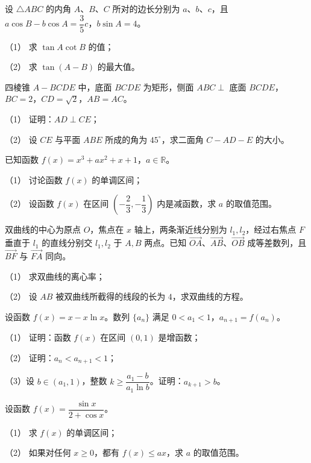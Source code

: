\begin{question}
设 $\triangle ABC$ 的内角 $A\text{、}B\text{、}C$ 所对的边长分别为 $a\text{、}b\text{、}c$，且 $a\cos B-b\cos A=\dfrac35c$，$b\sin A=4$。

（1） 求 $\tan A\cot B$ 的值；

（2） 求 $\tan(A-B)$ 的最大值。

\Needspace{0.4\textheight}
\end{question}
\begin{question}
四棱锥 $A-BCDE$ 中，底面 $BCDE$ 为矩形，侧面 $ABC\perp$ 底面 $BCDE$，$BC=2$，$CD=\sqrt2$，$AB=AC$。
\nopagebreak[4]
\begin{center}\end{center}
\nopagebreak[4]
（1） 证明：$AD\perp CE$；

（2） 设 $CE$ 与平面 $ABE$ 所成的角为 $45^\circ$，求二面角 $C-AD-E$ 的大小。

\end{question}
\begin{question}
已知函数 $f(x)=x^3+ax^2+x+1$，$a\in\mathbb R$。

（1） 讨论函数 $f(x)$ 的单调区间；

（2） 设函数 $f(x)$ 在区间 $\left(-\dfrac23,-\dfrac13\right)$ 内是减函数，求 $a$ 的取值范围。

\end{question}
\begin{question}
双曲线的中心为原点 $O$，焦点在 $x$ 轴上，两条渐近线分别为 $l_1,l_2$，经过右焦点 $F$ 垂直于 $l_1$ 的直线分别交 $l_1,l_2$ 于 $A,B$ 两点。已知 $\overrightarrow{OA}$、$\overrightarrow{AB}$、$\overrightarrow{OB}$ 成等差数列，且 $\overrightarrow{BF}$ 与 $\overrightarrow{FA}$ 同向。

（1） 求双曲线的离心率；

（2） 设 $AB$ 被双曲线所截得的线段的长为 $4$，求双曲线的方程。

\end{question}
\begin{question}
设函数 $f(x)=x-x\ln x$。数列 $\{a_n\}$ 满足 $0<a_1<1$，$a_{n+1}=f(a_n)$。

（1） 证明：函数 $f(x)$ 在区间 $(0,1)$ 是增函数；

（2） 证明：$a_n<a_{n+1}<1$；

（3）设 $b\in(a_1,1)$，整数 $k\geqslant\dfrac{a_1-b}{a_1\ln b}$。证明：$a_{k+1}>b$。

\end{question}
\begin{question}
设函数 $f(x)=\dfrac{\sin x}{2+\cos x}$。

（1） 求 $f(x)$ 的单调区间；

（2） 如果对任何 $x\geqslant0$，都有 $f(x)\leqslant ax$，求 $a$ 的取值范围。

\end{question}